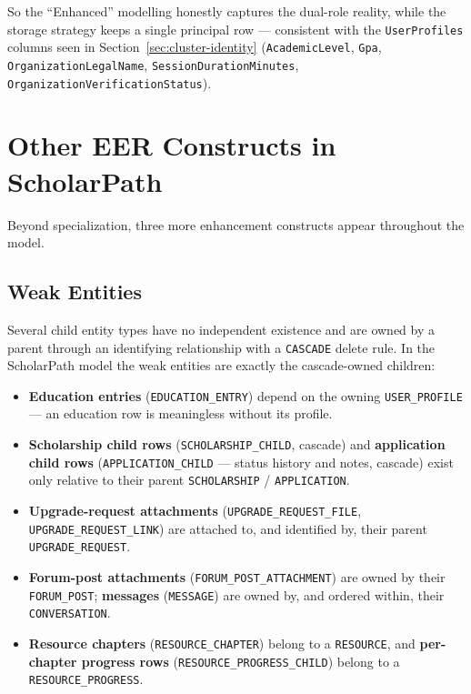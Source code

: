 \documentclass[11pt,a4paper]{article}
\begin{document}
So the ``Enhanced'' modelling honestly captures the dual-role reality, while the
storage strategy keeps a single principal row --- consistent with the
\texttt{UserProfiles} columns seen in Section~\ref{sec:cluster-identity}
(\texttt{AcademicLevel}, \texttt{Gpa}, \texttt{OrganizationLegalName},
\texttt{SessionDurationMinutes}, \texttt{OrganizationVerificationStatus}).

\section{Other EER Constructs in ScholarPath}

Beyond specialization, three more enhancement constructs appear throughout the
model.

\subsection{Weak Entities}

Several child entity types have no independent existence and are owned by a parent
through an identifying relationship with a \texttt{CASCADE} delete rule. In the
ScholarPath model the weak entities are exactly the cascade-owned children:

\begin{itemize}[leftmargin=1.4em]
  \item \textbf{Education entries} (\texttt{EDUCATION\_ENTRY}) depend on the
        owning \texttt{USER\_PROFILE} --- an education row is meaningless without
        its profile.
  \item \textbf{Scholarship child rows} (\texttt{SCHOLARSHIP\_CHILD}, cascade)
        and \textbf{application child rows} (\texttt{APPLICATION\_CHILD} ---
        status history and notes, cascade) exist only relative to their parent
        \texttt{SCHOLARSHIP} / \texttt{APPLICATION}.
  \item \textbf{Upgrade-request attachments}
        (\texttt{UPGRADE\_REQUEST\_FILE}, \texttt{UPGRADE\_REQUEST\_LINK}) are
        attached to, and identified by, their parent \texttt{UPGRADE\_REQUEST}.
  \item \textbf{Forum-post attachments} (\texttt{FORUM\_POST\_ATTACHMENT}) are
        owned by their \texttt{FORUM\_POST}; \textbf{messages}
        (\texttt{MESSAGE}) are owned by, and ordered within, their
        \texttt{CONVERSATION}.
  \item \textbf{Resource chapters} (\texttt{RESOURCE\_CHAPTER}) belong to a
        \texttt{RESOURCE}, and \textbf{per-chapter progress rows}
        (\texttt{RESOURCE\_PROGRESS\_CHILD}) belong to a
        \texttt{RESOURCE\_PROGRESS}.
\end{itemize}
\end{document}
